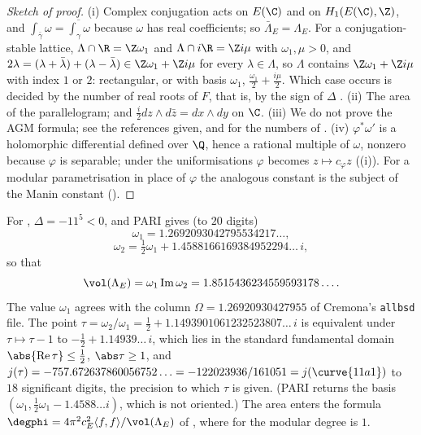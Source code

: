 \begin{proof}[Sketch of proof]
(i) Complex conjugation acts on $E(\C)$ and on $H_1(E(\C),\Z)$, and $\int_{\bar\gamma}\omega=\overline{\int_\gamma\omega}$ because $\omega$ has real coefficients; so $\bar\Lambda_E=\Lambda_E$. For a conjugation-stable
lattice, $\Lambda\cap\R=\Z\omega_1$ and $\Lambda\cap i\R=\Z i\mu$ with $\omega_1,\mu>0$, and $2\lambda=(\lambda+\bar\lambda)+(\lambda-\bar\lambda)\in\Z\omega_1+\Z i\mu$ for every $\lambda\in\Lambda$, so $\Lambda$ contains $\Z\omega_1+\Z i\mu$
with index $1$ or $2$: rectangular, or with basis $\omega_1$, $\frac{\omega_1}2+\frac{i\mu}2$. Which case occurs is decided by the number of real roots of $F$, that is, by the sign of
$\Delta$ \cite[Section 3.7]{Cremona97}. (ii) The area of the parallelogram; and $\frac i2dz\wedge d\bar z=dx\wedge dy$ on $\C$. (iii) We do not prove the AGM formula; see the references given, and
 for the numbers of . (iv) $\varphi^*\omega'$ is a holomorphic differential defined over $\Q$,
hence a rational multiple of $\omega$, nonzero because $\varphi$ is separable; under the uniformisations $\varphi$ becomes $z\mapsto c_\varphi z$ ((i)). For a modular parametrisation in place of $\varphi$ the
analogous constant is the subject of the Manin constant ().
\end{proof}

\begin{example}\label{ex:ellcurves:11a1-periods}
For , $\Delta=-11^5<0$, and PARI gives (to $20$ digits)
\[
\omega_1=1.2692093042795534217\ldots,
\]
\[
\omega_2=\tfrac12\omega_1+1.4588166169384952294\ldots\,i,
\]
so that
\[
\vol(\Lambda_E)=\omega_1\operatorname{Im}\omega_2=1.8515436234559593178\ldots .
\]
The value $\omega_1$ agrees with the column $\Omega=1.26920930427955$ of Cremona's \texttt{allbsd} file. The point
$\tau=\omega_2/\omega_1=\frac12+1.1493901061232523807\ldots\,i$ is equivalent under $\tau\mapsto\tau-1$ to $-\frac12+1.14939\ldots\,i$, which lies in the standard fundamental domain
$\abs{\operatorname{Re}\tau}\le\frac12$, $\abs\tau\ge1$, and $j(\tau)=-757.672637860056752\ldots=-122023936/161051=j(\curve{11a1})$ to $18$ significant digits, the precision to which $\tau$ is given. (PARI returns the
basis $(\omega_1,\frac12\omega_1-1.4588\ldots i)$, which is not oriented.) The area enters the formula $\degphi=4\pi^2c_E^2\langle f,f\rangle/\vol(\Lambda_E)$ of , where for
 the modular degree is $1$.
\end{example}

